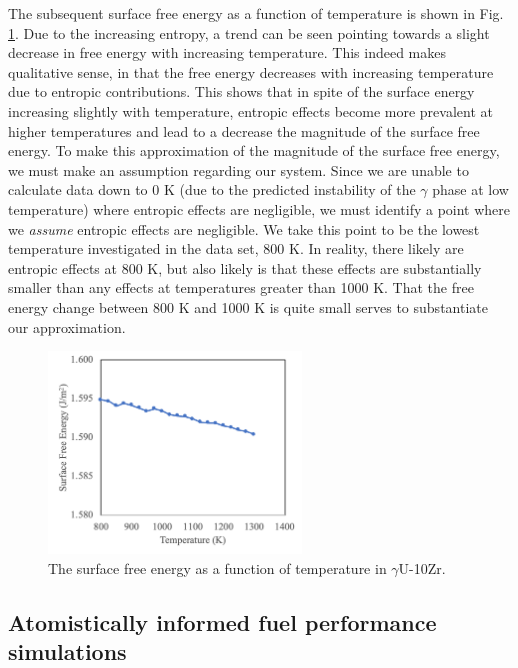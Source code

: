 \documentclass[review]{elsarticle}
\begin{document}
The subsequent surface free energy as a function of temperature is shown in Fig. \ref{fig:free}.  Due to the increasing entropy, a trend can be seen pointing towards a slight decrease in free energy with increasing temperature. This indeed makes qualitative sense, in that the free energy decreases with increasing temperature due to entropic contributions. This shows that in spite of the surface energy increasing slightly with temperature, entropic effects become more prevalent at higher temperatures and lead to a decrease the magnitude of the surface free energy. To make this approximation of the magnitude of the surface free energy, we must make an assumption regarding our system. Since we are unable to calculate data down to 0 K (due to the predicted instability of the $\gamma$ phase at low temperature) where entropic effects are negligible, we must identify a point where we \textit{assume} entropic effects are negligible. We take this point to be the lowest temperature investigated in the data set, 800 K. In reality, there likely are entropic effects at 800 K, but also likely is that these effects are substantially smaller than any effects at temperatures greater than 1000 K. That the free energy change between 800 K and 1000 K is quite small serves to substantiate our approximation. 

\begin{figure}[!htp]
\begin{center}
\includegraphics[width=0.6\textwidth]{10_free}
\end{center}
\caption{The surface free energy as a function of temperature in $\gamma$U-10Zr.}
\label{fig:free}
\end{figure}

\FloatBarrier

\subsection{Atomistically informed fuel performance simulations}
\end{document}

